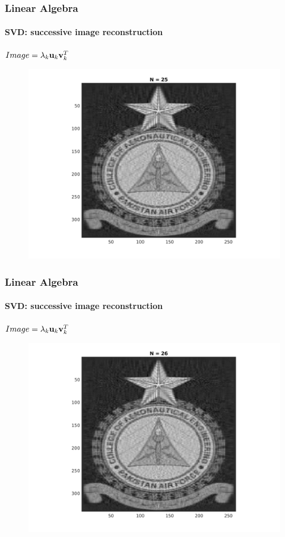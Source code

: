 \documentclass[hyperref={pdfpagelabels=true}]{beamer}
\begin{document}
\begin{frame}
\frametitle{Linear Algebra}
\framesubtitle{SVD: successive image reconstruction} 
\small{
\begin{center}
$Image = \lambda_k{\bf u}_k {\bf v}_k^T$
\end{center}}
\begin{figure}[!htb]
\centering
\includegraphics [scale=0.48]{n/b25.png}
\end{figure}
\end{frame}

\begin{frame}
\frametitle{Linear Algebra}
\framesubtitle{SVD: successive image reconstruction} 
\small{
\begin{center}
$Image = \lambda_k{\bf u}_k {\bf v}_k^T$
\end{center}}
\begin{figure}[!htb]
\centering
\includegraphics [scale=0.48]{n/b26.png}
\end{figure}
\end{frame}
\end{document}
